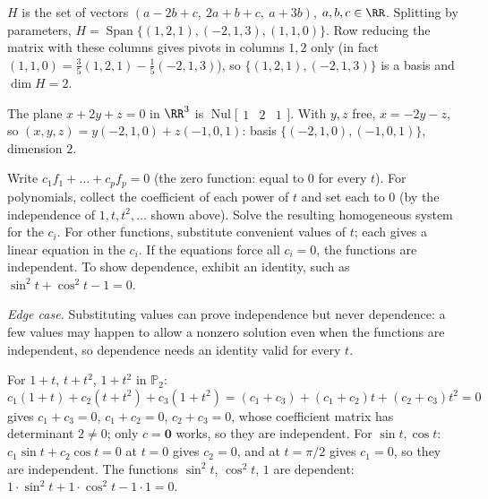 \documentclass[10pt]{scrartcl}
\newcommand{\vv}[1]{\mathbf{#1}}
\DeclareMathOperator{\spn}{Span}\DeclareMathOperator{\Nul}{Nul}\DeclareMathOperator{\Col}{Col}\DeclareMathOperator{\Row}{Row}\DeclareMathOperator{\nullity}{nullity}
\begin{document}
\begin{example*}
$H$ is the set of vectors $(a-2b+c,\ 2a+b+c,\ a+3b)$, $a,b,c\in\RR$. Splitting by parameters, $H=\spn\{(1,2,1),(-2,1,3),(1,1,0)\}$. Row reducing the matrix with these columns gives pivots in columns $1,2$ only (in fact $(1,1,0)=\tfrac35(1,2,1)-\tfrac15(-2,1,3)$), so $\{(1,2,1),(-2,1,3)\}$ is a basis and $\dim H=2$.
\end{example*}

\begin{example*}
The plane $x+2y+z=0$ in $\RR^3$ is $\Nul\bigl[\begin{smallmatrix}1&2&1\end{smallmatrix}\bigr]$. With $y,z$ free, $x=-2y-z$, so $(x,y,z)=y(-2,1,0)+z(-1,0,1)$: basis $\{(-2,1,0),(-1,0,1)\}$, dimension $2$.
\end{example*}

\begin{steps}
  \ii Write $c_1f_1+\dots+c_pf_p=0$ (the zero function: equal to $0$ for every $t$).
  \ii For polynomials, collect the coefficient of each power of $t$ and set each to $0$ (by the independence of $1,t,t^2,\dots$ shown above). Solve the resulting homogeneous system for the $c_i$.
  \ii For other functions, substitute convenient values of $t$; each gives a linear equation in the $c_i$. If the equations force all $c_i=0$, the functions are independent.
  \ii To show dependence, exhibit an identity, such as $\sin^2t+\cos^2t-1=0$.
\end{steps}
\emph{Edge case.} Substituting values can prove independence but never dependence: a few values may happen to allow a nonzero solution even when the functions are independent, so dependence needs an identity valid for every $t$.

\begin{example*}
For $1+t$, $t+t^2$, $1+t^2$ in $\mathbb P_2$:
\[
  c_1(1+t)+c_2(t+t^2)+c_3(1+t^2)=(c_1+c_3)+(c_1+c_2)t+(c_2+c_3)t^2=0
\]
gives $c_1+c_3=0$, $c_1+c_2=0$, $c_2+c_3=0$, whose coefficient matrix has determinant $2\ne0$; only $c=\vv 0$ works, so they are independent. For $\sin t,\cos t$: $c_1\sin t+c_2\cos t=0$ at $t=0$ gives $c_2=0$, and at $t=\pi/2$ gives $c_1=0$, so they are independent. The functions $\sin^2t$, $\cos^2t$, $1$ are dependent: $1\cdot\sin^2t+1\cdot\cos^2t-1\cdot1=0$.
\end{example*}
\end{document}
